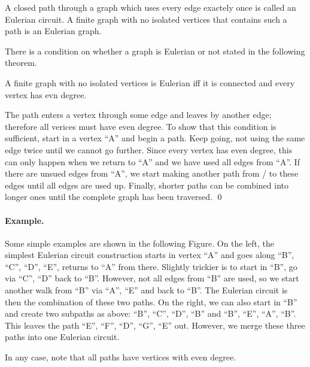 \begin{definition}
A closed path through a graph which uses every edge exactely once is called an Eulerian circuit. A finite graph with no isolated vertices that contains such a path is an Eulerian graph.
\end{definition}

There is a condition on whether a graph is Eulerian or not stated in the following theorem.

\begin{theorem}
A finite graph with no isolated vertices is Eulerian iff it is connected and every vertex has evn degree.
\end{theorem}

The path enters a vertex through some edge and leaves by another edge; therefore all verices must have even degree. To show that this condition is sufficient, start in a vertex ``A'' and begin a path. Keep going, not using the same edge twice until we cannot go further. Since every vertex has even degree, this can only happen when we return to ``A'' and we have used all edges from ``A''. If there are unsued edges from ``A'', we start making another path from / to these edges until all edges are used up. Finally, shorter paths can be combined into longer ones until the complete graph has been traversed. \qed

\paragraph{Example.} Some simple examples are shown in the following Figure. On the left, the simplest Eulerian circuit construction starts in vertex ``A'' and goes along ``B'', ``C'', ``D'', ``E'', returns to ``A'' from there. Slightly trickier is to start in ``B'', go via ``C'', ``D'' back to ``B''. However, not all edges from ``B'' are used, so we start another walk from ``B'' via ``A'', ``E'' and back to ``B''. The Eulerian circuit is then the combination of these two paths. On the right, we can also start in ``B'' and create two subpaths as above: ``B'', ``C'', ``D'', ``B'' and ``B'', ``E'', ``A'', ``B''. This leaves the path ``E'', ``F'', ``D'', ``G'', ``E'' out. However, we merge these three paths into one Eulerian circuit.

In any case, note that all paths have vertices with even degree.

